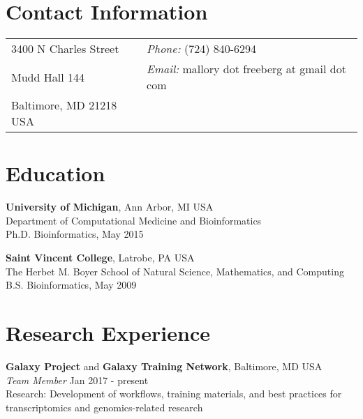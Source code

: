 \documentclass[margin,line]{res}
\begin{document}

\begin{resume}
\section{\sc Contact Information}
\begin{tabular}{@{}p{2.5in}p{5in}}
3400 N Charles Street & {\it Phone:}  (724) 840-6294 \\            
Mudd Hall 144 & {\it Email:}  mallory dot freeberg at gmail dot com \\ %
Baltimore, MD  21218 USA &  
\end{tabular}


\section{\sc Education}
{\bf University of Michigan}, Ann Arbor, MI USA\\
{Department of Computational Medicine and Bioinformatics}\\ 
{Ph.D. Bioinformatics, May 2015}

{\bf Saint Vincent College}, Latrobe, PA USA\\
{The Herbet M. Boyer School of Natural Science, Mathematics, and Computing} \\
{B.S. Bioinformatics,  May 2009}

\section{\sc Research Experience}
{\bf Galaxy Project} and {\bf Galaxy Training Network}, Baltimore, MD USA\\
{\em Team Member} \hfill {Jan 2017 - present}\\
Research: Development of workflows, training materials, and best practices for transcriptomics and genomics-related research


\end{resume}
\end{document}
